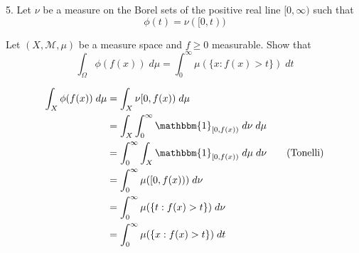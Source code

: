 \documentclass[12pt]{article}
\newcommand{\ind}{\mathbbm{1}}
\newcommand{\M}{\mathcal{M}}
\begin{document}
    \color{black}

\pagebreak

5. Let $\nu$ be a measure on the Borel sets of the positive real line $[0, \infty)$ such that 
\[\phi(t) = \nu([0, t))\]

Let $(X, \M, \mu)$ be a measure space and $f \geq 0$ measurable. Show that 
\[\int_{\Omega} \phi(f(x)) \; d\mu = \int_0^{\infty} \mu(\{x: f(x) > t\})\; dt\]

    \color{blue} 
        \begin{align*}
            \int_{X} \phi(f(x)) \; d\mu &= \int_{X} \nu[0, f(x))\; d\mu\\ 
            &= \int_X \int_0^{\infty} \ind_{[0, f(x))} \; d\nu \; d\mu\\ 
            &= \int_0^{\infty} \int_X \ind_{[0, f(x))} \; d\mu \; d\nu \qquad (\text{Tonelli})\\ 
            &= \int_0^{\infty} \mu([0,f(x))) \; d\nu\\
            &= \int_0^{\infty} \mu(\{t: f(x) > t\})\; d\nu\\ 
            &= \int_0^{\infty} \mu(\{x: f(x) > t\})\; dt
        \end{align*}
    \color{black}
\end{document}
